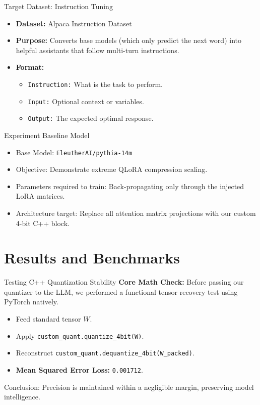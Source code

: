 \documentclass[aspectratio=169]{beamer}
\begin{document}
\begin{frame}{Target Dataset: Instruction Tuning}
    \begin{itemize}
        \item \textbf{Dataset:} Alpaca Instruction Dataset
        \item \textbf{Purpose:} Converts base models (which only predict the next word) into helpful assistants that follow multi-turn instructions.
        \item \textbf{Format:}
        \begin{itemize}
            \item \texttt{Instruction:} What is the task to perform.
            \item \texttt{Input:} Optional context or variables.
            \item \texttt{Output:} The expected optimal response.
        \end{itemize}
    \end{itemize}
\end{frame}

\begin{frame}{Experiment Baseline Model}
    \begin{itemize}
        \item Base Model: \texttt{EleutherAI/pythia-14m}
        \item Objective: Demonstrate extreme QLoRA compression scaling.
        \item Parameters required to train: Back-propagating only through the injected LoRA matrices.
        \item Architecture target: Replace all attention matrix projections with our custom 4-bit C++ block.
    \end{itemize}
\end{frame}

\section{Results and Benchmarks}

\begin{frame}{Testing C++ Quantization Stability}
    \textbf{Core Math Check:} Before passing our quantizer to the LLM, we performed a functional tensor recovery test using PyTorch natively.
    \begin{itemize}
        \item Feed standard tensor $W$.
        \item Apply \texttt{custom\_quant.quantize\_4bit(W)}.
        \item Reconstruct \texttt{custom\_quant.dequantize\_4bit(W\_packed)}.
        \item \textbf{Mean Squared Error Loss:} \texttt{0.001712}.
    \end{itemize}
    Conclusion: Precision is maintained within a negligible margin, preserving model intelligence.
\end{frame}
\end{document}

